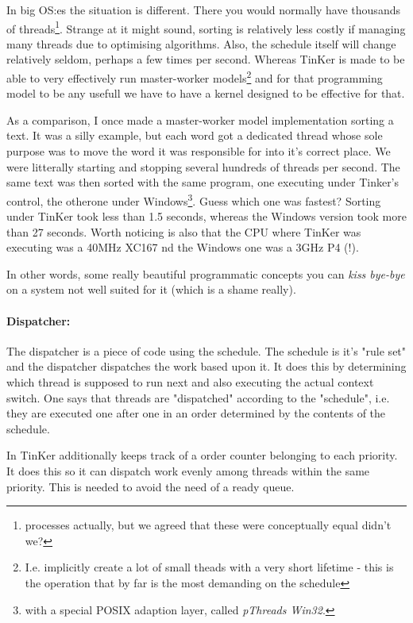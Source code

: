 		In big OS:es the situation is different. There you would normally have thousands of threads\footnote{processes actually, but we agreed that these were conceptually equal didn't we?}. Strange at it might sound, sorting is relatively less costly if managing many threads due to optimising algorithms. Also, the schedule itself will change relatively seldom, perhaps a few times per second. Whereas TinKer is made to be able to very effectively run master-worker models\footnote{I.e. implicitly create a lot of small theads with a very short lifetime - this is the operation that by far is the most demanding on the schedule} and for that programming model to be any usefull we have to have a kernel designed to be effective for that.

		As a comparison, I once made a master-worker model implementation sorting a text. It was a silly example, but each word got a dedicated thread whose sole purpose was to move the word it was responsible for into it's correct place. We were litterally starting and stopping several hundreds of threads per second. The same text was then sorted with the same program, one executing under Tinker's control, the otherone under Windows\footnote{with a special POSIX adaption layer, called \textit{pThreads Win32}.}. Guess which one was fastest? Sorting under TinKer took less than 1.5 seconds, whereas the Windows version took more than 27 seconds. Worth noticing is also that the CPU where TinKer was executing was a 40MHz XC167 nd the Windows one was a 3GHz P4 (!).

		In other words, some really beautiful programmatic concepts you can \textit{kiss bye-bye} on a system not well suited for it (which is a shame really).

		\paragraph{Dispatcher:} The dispatcher is a piece of code using the schedule. The schedule is it's "rule set" and the dispatcher dispatches the work based upon it. It does this by determining which thread is supposed to run next and also executing the actual context switch. One says that threads are "dispatched" according to the "schedule", i.e. they are executed one after one in an order determined by the contents of the schedule.
		
		In TinKer additionally keeps track of a order counter belonging to each priority. It does this so it can dispatch work evenly among threads within the same priority. This is needed to avoid the need of a ready queue.


